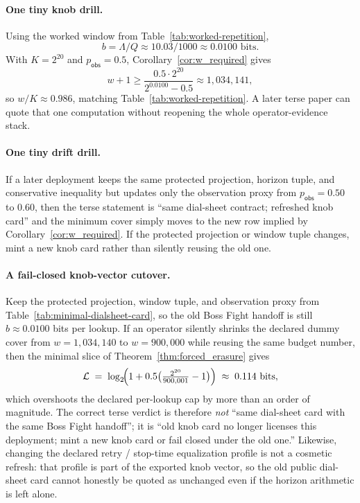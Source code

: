 \documentclass[11pt]{article}
\newcommand{\MaxL}{\mathcal{L}}
\newcommand{\logtwo}{\log_2}
\begin{document}
\paragraph{One tiny knob drill.}
Using the worked window from Table~\ref{tab:worked-repetition},
\[
b=\Lambda/Q \approx 10.03/1000 \approx 0.0100 \text{ bits}.
\]
With $K=2^{20}$ and $p_{\mathsf{obs}}=0.5$, Corollary~\ref{cor:w_required} gives
\[
w{+}1 \ge \frac{0.5\cdot 2^{20}}{2^{0.0100}-0.5} \approx 1{,}034{,}141,
\]
so $w/K\approx 0.986$, matching Table~\ref{tab:worked-repetition}. A later terse paper can quote that one computation without reopening the whole operator-evidence stack.

\paragraph{One tiny drift drill.} If a later deployment keeps the same protected projection, horizon tuple, and conservative inequality but updates only the observation proxy from $p_{\mathsf{obs}}=0.50$ to $0.60$, then the terse statement is ``same dial-sheet contract; refreshed knob card'' and the minimum cover simply moves to the new row implied by Corollary~\ref{cor:w_required}. If the protected projection or window tuple changes, mint a new knob card rather than silently reusing the old one.

\paragraph{A fail-closed knob-vector cutover.}
Keep the protected projection, window tuple, and observation proxy from Table~\ref{tab:minimal-dialsheet-card}, so the old Boss Fight handoff is still $b\approx 0.0100$ bits per lookup.
If an operator silently shrinks the declared dummy cover from $w=1{,}034{,}140$ to $w=900{,}000$ while reusing the same budget number, then the minimal slice of Theorem~\ref{thm:forced_erasure} gives
\[
\MaxL \;=\; \logtwo\!\Bigl(1+0.5\bigl(\tfrac{2^{20}}{900{,}001}-1\bigr)\Bigr)\;\approx\;0.114\ \text{bits},
\]
which overshoots the declared per-lookup cap by more than an order of magnitude.
The correct terse verdict is therefore \emph{not} ``same dial-sheet card with the same Boss Fight handoff'';
it is ``old knob card no longer licenses this deployment; mint a new knob card or fail closed under the old one.''
Likewise, changing the declared retry / stop-time equalization profile is not a cosmetic refresh:
that profile is part of the exported knob vector, so the old public dial-sheet card cannot honestly be quoted as unchanged even if the horizon arithmetic is left alone.
\end{document}
